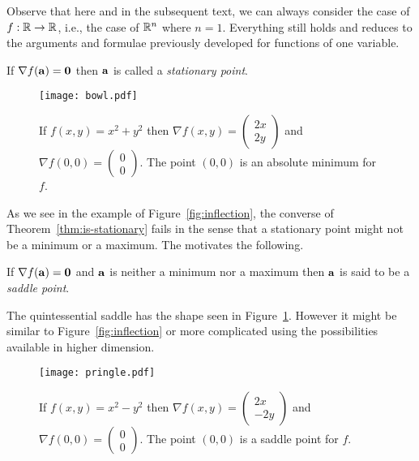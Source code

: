 Observe that here and in the subsequent text, we can always consider the case of \(f:\bR \to \bR\), i.e., the case of \(\bR^n\) where \(n=1\).
Everything still holds and reduces to the arguments and formulae previously developed for functions of one variable.


\begin{definition}
    If \(\nabla f(\aa)=\mathbf{0}\) then \(\aa\) is called a \emph{stationary point}.
\end{definition}


\begin{figure}[htbp]
    \begin{center}
        \texttt{[image: bowl.pdf]}
        \caption{If \(f(x,y)=x^2+y^2\) then \(\nabla f(x,y) = \left(\begin{smallmatrix}
                2x\\2y
            \end{smallmatrix}\right)\) and \(\nabla f(0,0) =\left(\begin{smallmatrix}
                0\\0
            \end{smallmatrix}\right) \). The point \((0,0)\) is an absolute minimum for \(f\).}
    \end{center}
\end{figure}

As we see in the example of Figure~\ref{fig:inflection}, the converse of Theorem~\ref{thm:is-stationary} fails in the sense that a stationary point might not be a minimum or a maximum.
The motivates the following.

\begin{definition}
    If \(\nabla f(\aa)=\mathbf{0}\) and \(\aa\) is neither a minimum nor a maximum then \(\aa\) is said to be a \emph{saddle point}.
\end{definition}

The quintessential saddle has the shape seen in Figure~\ref{fig:pringle}.
However it might be similar to Figure~\ref{fig:inflection} or more complicated using the possibilities available in higher dimension.

\begin{figure}[htbp]
    \centering
    \texttt{[image: pringle.pdf]}
    \caption{If \(f(x,y)=x^2-y^2\) then \(\nabla f(x,y) = \left(\begin{smallmatrix}
            2x\\-2y
        \end{smallmatrix}\right)\) and \(\nabla f(0,0) =\left(\begin{smallmatrix}
            0\\0
        \end{smallmatrix}\right) \). The point \((0,0)\) is a saddle point for \(f\).}
    \label{fig:pringle}
\end{figure}


